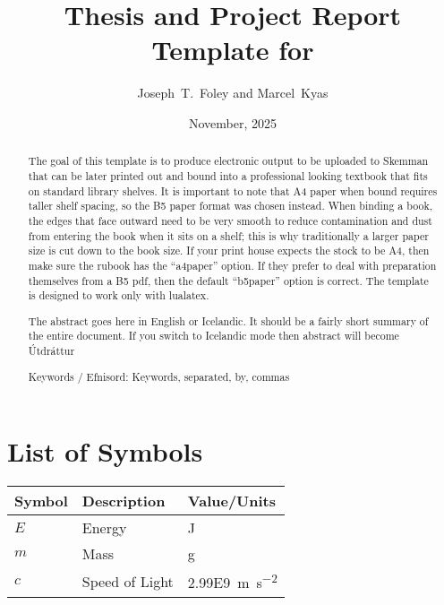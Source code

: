 \documentclass[12pt, a4paper]{memoir}
\title{Thesis and Project Report Template for \theInstitution{}}
\author{Joseph~T.~Foley and Marcel~Kyas}
\date{November, 2025}%
\begin{document}
\maketitle{}
\disableindents{}%
\copyrightpage{}



\tableofcontents{}
\listoffigures{}
\listoftables{}
\chapter{List of Symbols}
\begin{tabular}{lll}\toprule
  Symbol &Description &Value/Units\\\midrule
  $E$ &Energy &\si{\joule}\\
  $m$ &Mass &\si{\gram}\\
  $c$ &Speed of Light &\SI{2.99E9}{\meter\per\square\second}\\\bottomrule
\end{tabular}

\enableindents{}%
\newpage
\begin{abstract}
  The goal of this template is to produce electronic output to be uploaded to Skemman that can be later printed out and bound into a professional looking textbook that fits on standard library shelves.
  It is important to note that A4 paper when bound requires taller shelf spacing, so the B5 paper format was chosen instead.
  When binding a book, the edges that face outward need to be very smooth to reduce contamination and dust from entering the book when it sits on a shelf; this is why traditionally a larger paper size is cut down to the book size.
  If your print house expects the stock to be A4, then make sure the rubook has the ``a4paper'' option.
  If they prefer to deal with preparation themselves from a B5 pdf, then the default ``b5paper'' option is correct.
  The template is designed to work only with lualatex.
  
  The abstract goes here in English or Icelandic.
  It should be a fairly short summary of the entire document.
  If you switch to Icelandic mode then abstract will become \'{U}tdr\'{a}ttur

  Keywords / Efnisord:  Keywords, separated, by, commas
\end{abstract}
\end{document}
